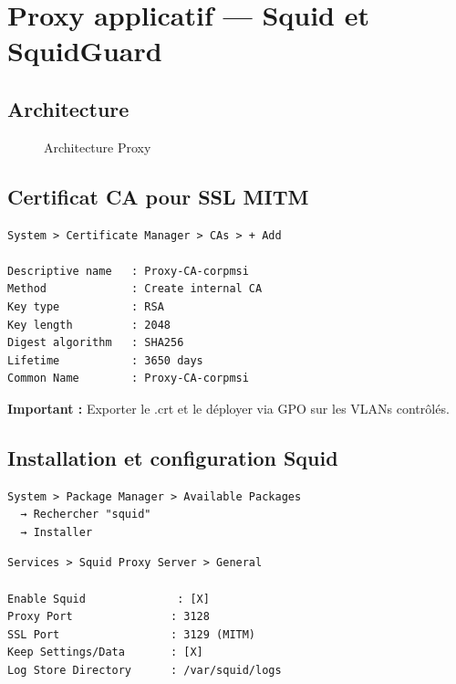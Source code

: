 \chapter{Proxy applicatif — Squid et SquidGuard}

\section{Architecture}

\begin{figure}[H]
    \centering
    \caption{Architecture Proxy}
    \label{fig:proxy-arch}
\end{figure}

\section{Certificat CA pour SSL MITM}

\begin{lstlisting}
System > Certificate Manager > CAs > + Add

Descriptive name   : Proxy-CA-corpmsi
Method             : Create internal CA
Key type           : RSA
Key length         : 2048
Digest algorithm   : SHA256
Lifetime           : 3650 days
Common Name        : Proxy-CA-corpmsi
\end{lstlisting}

\textbf{Important :} Exporter le .crt et le déployer via GPO sur les VLANs contrôlés.

\section{Installation et configuration Squid}

\begin{lstlisting}
System > Package Manager > Available Packages
  → Rechercher "squid"
  → Installer
\end{lstlisting}

\begin{lstlisting}
Services > Squid Proxy Server > General

Enable Squid              : [X]
Proxy Port               : 3128
SSL Port                 : 3129 (MITM)
Keep Settings/Data       : [X]
Log Store Directory      : /var/squid/logs
\end{lstlisting}

